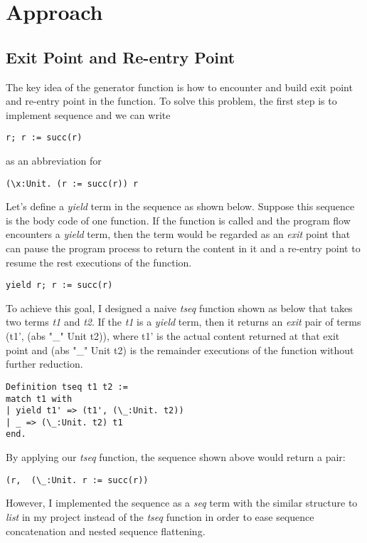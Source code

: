 \section{Approach}

\subsection{Exit Point and Re-entry Point}
The key idea of the generator function is how to encounter and build exit point and re-entry point in the function. 
To solve this problem, the first step is to implement sequence and we can write 
\begin{lstlisting}[basicstyle=\small]
r; r := succ(r)
\end{lstlisting}
as an abbreviation for 
\begin{lstlisting}[basicstyle=\small]
(\x:Unit. (r := succ(r)) r
\end{lstlisting}
Let's define a \textit{yield} term in the sequence as shown below. Suppose this sequence is the body code of one function. If the function is called and the program flow encounters a \textit{yield} term, then the term would be regarded as an \textit{exit} point that can pause the program process to return the content in it and a re-entry point to resume the rest executions of the function.
\begin{lstlisting}[basicstyle=\small]
yield r; r := succ(r)
\end{lstlisting}
To achieve this goal, I designed a naive \textit{tseq} function shown as below that takes two terms \textit{t1} and \textit{t2}. If the \textit{t1} is a \textit{yield} term, then it returns an \textit{exit} pair of terms (t1', (abs "_" Unit t2)), where t1' is the actual content returned at that exit point and (abs "_" Unit t2) is the remainder executions of the function without further reduction.
\begin{lstlisting}[basicstyle=\small]
Definition tseq t1 t2 := 
match t1 with 
| yield t1' => (t1', (\_:Unit. t2))
| _ => (\_:Unit. t2) t1
end.
\end{lstlisting}
By applying our \textit{tseq} function, the sequence shown above would return a pair:
\begin{lstlisting}[basicstyle=\small]
(r,  (\_:Unit. r := succ(r))
\end{lstlisting}
However, I implemented the sequence as a \textit{seq} term with the similar structure to \textit{list} in my project instead of the \textit{tseq} function in order to ease sequence concatenation and nested sequence flattening.

